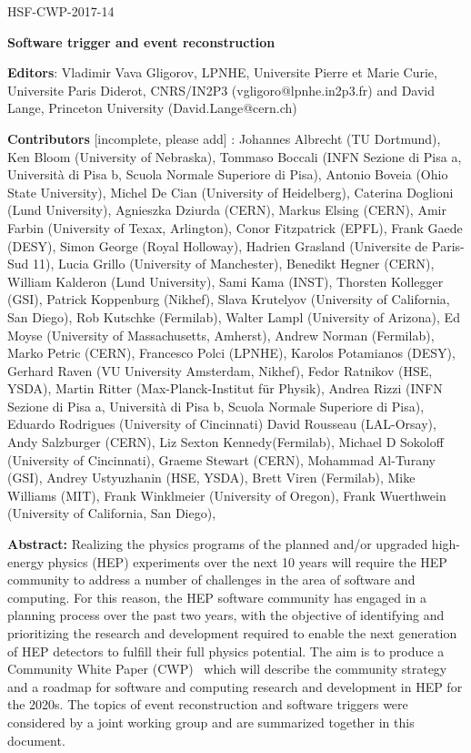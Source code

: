 \begin{flushright}
HSF-CWP-2017-14
\end{flushright}

\Large
\begin{center}
{\bf Software trigger and event reconstruction}
\end{center}
\vskip 1cm

\normalsize

\hangindent=1cm
{\bf Editors}: Vladimir Vava Gligorov, LPNHE, Universite Pierre et Marie Curie, Universite Paris Diderot, CNRS/IN2P3 (vgligoro@lpnhe.in2p3.fr) and David Lange, Princeton University (David.Lange@cern.ch) 

\vskip 0.2cm
\hangindent=1cm
{\bf Contributors} [incomplete, please add] : 
Johannes Albrecht (TU Dortmund), 
Ken Bloom (University of Nebraska), 
Tommaso Boccali (INFN Sezione di Pisa a, Università di Pisa b, Scuola Normale Superiore di Pisa), 
Antonio Boveia (Ohio State University), 
Michel De Cian (University of Heidelberg), 
Caterina Doglioni (Lund University), 
Agnieszka Dziurda (CERN), 
Markus Elsing (CERN), 
Amir Farbin (University of Texax, Arlington), 
Conor Fitzpatrick (EPFL), 
Frank Gaede (DESY), 
Simon George (Royal Holloway), 
Hadrien Grasland (Universite de Paris-Sud 11), 
Lucia Grillo (University of Manchester), 
Benedikt Hegner (CERN), 
William Kalderon (Lund University), 
Sami Kama (INST), 
Thorsten Kollegger (GSI), 
Patrick Koppenburg (Nikhef), 
Slava Krutelyov (University of California, San Diego), 
Rob Kutschke (Fermilab), 
Walter Lampl (University of Arizona), 
Ed Moyse (University of Massachusetts, Amherst), 
Andrew Norman (Fermilab), 
Marko Petric (CERN), 
Francesco Polci (LPNHE), 
Karolos Potamianos (DESY), 
Gerhard Raven (VU University Amsterdam, Nikhef), 
Fedor Ratnikov (HSE, YSDA), 
Martin Ritter (Max-Planck-Institut für Physik),  
Andrea Rizzi (INFN Sezione di Pisa a, Università di Pisa b, Scuola Normale Superiore di Pisa), 
Eduardo Rodrigues (University of Cincinnati)
David Rousseau (LAL-Orsay), 
Andy Salzburger (CERN), 
Liz Sexton Kennedy(Fermilab), 
Michael D Sokoloff (University of Cincinnati), 
Graeme Stewart (CERN), 
Mohammad Al-Turany (GSI),  
Andrey Ustyuzhanin (HSE, YSDA), 
Brett Viren (Fermilab), 
Mike Williams (MIT), 
Frank Winklmeier (University of Oregon), 
Frank Wuerthwein (University of California, San Diego), 

\vskip 1cm


\hangindent=2cm
{\bf Abstract:} Realizing the physics programs of the planned and/or upgraded high-energy physics (HEP) experiments over the next 10 years will require the HEP community to address a number of challenges in the area of software and computing. For this reason, the HEP software community has engaged in a planning process over the past two years, with the objective of identifying and prioritizing the research and development required to enable the next generation of HEP detectors to fulfill their full physics potential. The aim is to produce a Community White Paper (CWP)~\cite{HSF2017} which will describe the community strategy and a roadmap for software and computing research and development in HEP for the 2020s. The topics of event reconstruction and software triggers were considered by a joint working group and are summarized together in this document.

